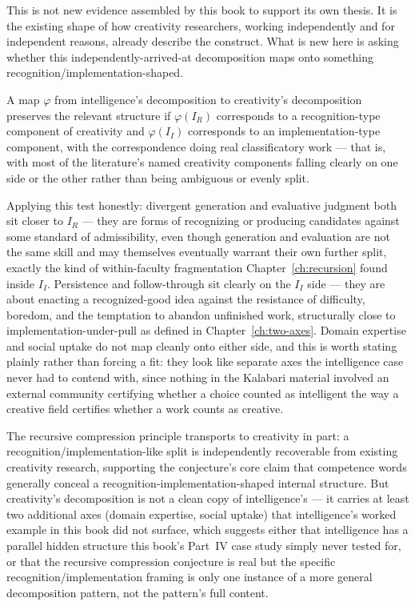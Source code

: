 This is not new evidence assembled by this book to support its own thesis. It is the existing shape of how creativity researchers, working independently and for independent reasons, already describe the construct. What is new here is asking whether this independently-arrived-at decomposition maps onto something recognition/implementation-shaped.

\begin{definition}
A map $\varphi$ from intelligence's decomposition to creativity's decomposition preserves the relevant structure if $\varphi(I_R)$ corresponds to a recognition-type component of creativity and $\varphi(I_I)$ corresponds to an implementation-type component, with the correspondence doing real classificatory work --- that is, with most of the literature's named creativity components falling clearly on one side or the other rather than being ambiguous or evenly split.
\end{definition}

Applying this test honestly: divergent generation and evaluative judgment both sit closer to $I_R$ --- they are forms of recognizing or producing candidates against some standard of admissibility, even though generation and evaluation are not the same skill and may themselves eventually warrant their own further split, exactly the kind of within-faculty fragmentation Chapter~\ref{ch:recursion} found inside $I_I$. Persistence and follow-through sit clearly on the $I_I$ side --- they are about enacting a recognized-good idea against the resistance of difficulty, boredom, and the temptation to abandon unfinished work, structurally close to implementation-under-pull as defined in Chapter~\ref{ch:two-axes}. Domain expertise and social uptake do not map cleanly onto either side, and this is worth stating plainly rather than forcing a fit: they look like separate axes the intelligence case never had to contend with, since nothing in the Kalabari material involved an external community certifying whether a choice counted as intelligent the way a creative field certifies whether a work counts as creative.

\begin{conjecture}
The recursive compression principle transports to creativity in part: a recognition/implementation-like split is independently recoverable from existing creativity research, supporting the conjecture's core claim that competence words generally conceal a recognition-implementation-shaped internal structure. But creativity's decomposition is not a clean copy of intelligence's --- it carries at least two additional axes (domain expertise, social uptake) that intelligence's worked example in this book did not surface, which suggests either that intelligence has a parallel hidden structure this book's Part~IV case study simply never tested for, or that the recursive compression conjecture is real but the specific recognition/implementation framing is only one instance of a more general decomposition pattern, not the pattern's full content.
\end{conjecture}

